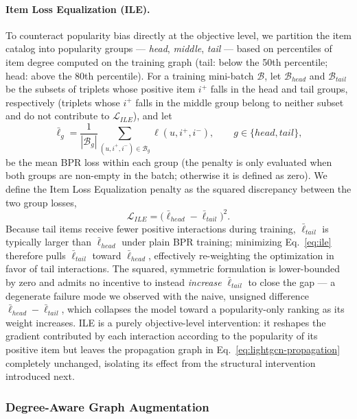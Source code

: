 \paragraph{Item Loss Equalization (ILE).}
To counteract popularity bias directly at the objective level, we partition the item catalog
into popularity groups --- \emph{head}, \emph{middle}, \emph{tail} --- based on percentiles
of item degree computed on the training graph (tail: below the 50th percentile; head: above
the 80th percentile). For a training mini-batch $\mathcal{B}$, let $\mathcal{B}_{head}$ and
$\mathcal{B}_{tail}$ be the subsets of triplets whose positive item $i^+$ falls in the head
and tail groups, respectively (triplets whose $i^+$ falls in the middle group belong to
neither subset and do not contribute to $\mathcal{L}_{ILE}$), and let
\begin{equation}
    \bar\ell_{g} = \frac{1}{|\mathcal{B}_{g}|}\sum_{(u,i^+,i^-)\in \mathcal{B}_{g}} \ell(u,i^+,i^-),
    \qquad g \in \{head, tail\},
\end{equation}
be the mean BPR loss within each group (the penalty is only evaluated when both groups are
non-empty in the batch; otherwise it is defined as zero). We define the Item Loss
Equalization penalty as the squared discrepancy between the two group losses,
\begin{equation}
    \mathcal{L}_{ILE} = \big(\bar\ell_{head} - \bar\ell_{tail}\big)^2 .
    \label{eq:ile}
\end{equation}
Because tail items receive fewer positive interactions during training, $\bar\ell_{tail}$ is
typically larger than $\bar\ell_{head}$ under plain BPR training; minimizing
Eq.~\eqref{eq:ile} therefore pulls $\bar\ell_{tail}$ toward $\bar\ell_{head}$, effectively
re-weighting the optimization in favor of tail interactions. The squared, symmetric
formulation is lower-bounded by zero and admits no incentive to instead \emph{increase}
$\bar\ell_{tail}$ to close the gap --- a degenerate failure mode we observed with the naive,
unsigned difference $\bar\ell_{head} - \bar\ell_{tail}$, which collapses the model toward a
popularity-only ranking as its weight increases. ILE is a purely objective-level
intervention: it reshapes the gradient contributed by each interaction according to the
popularity of its positive item but leaves the propagation graph in
Eq.~\eqref{eq:lightgcn-propagation} completely unchanged, isolating its effect from the
structural intervention introduced next.

\subsubsection{Degree-Aware Graph Augmentation}
\label{sec:optional_degree_aware_graph_augmentation}

